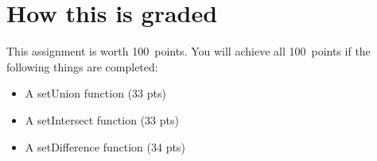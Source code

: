 \documentclass{article}
\newcommand{\AValue}{100}
\begin{document}
\section*{How this is graded}
This assignment is worth \AValue \ points. You will achieve all \AValue \   points if the following things are completed:
\begin{itemize}
    \item A setUnion function (33 pts)
    \item A setIntersect function (33 pts)
    \item A setDifference function (34 pts)
\end{itemize}
\end{document}
